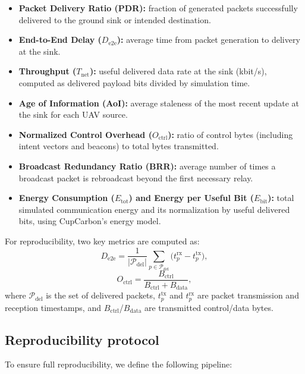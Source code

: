 \documentclass[5p,times]{elsarticle}
\begin{document}
\begin{itemize}
\item \textbf{Packet Delivery Ratio (PDR):} fraction of generated packets successfully delivered to the ground sink or intended destination.
\item \textbf{End-to-End Delay ($D_{\mathrm{e2e}}$):} average time from packet generation to delivery at the sink.
\item \textbf{Throughput ($T_{\mathrm{net}}$):} useful delivered data rate at the sink (kbit/s), computed as delivered payload bits divided by simulation time.
\item \textbf{Age of Information (AoI):} average staleness of the most recent update at the sink for each UAV source.
\item \textbf{Normalized Control Overhead ($O_{\mathrm{ctrl}}$):} ratio of control bytes (including intent vectors and beacons) to total bytes transmitted.
\item \textbf{Broadcast Redundancy Ratio (BRR):} average number of times a broadcast packet is rebroadcast beyond the first necessary relay.
\item \textbf{Energy Consumption ($E_{\mathrm{tot}}$) and Energy per Useful Bit ($E_{\mathrm{bit}}$):} total simulated communication energy and its normalization by useful delivered bits, using CupCarbon's energy model.
\end{itemize}
For reproducibility, two key metrics are computed as:
\begin{equation}
\label{eq:delay_metric}
D_{\mathrm{e2e}} = \frac{1}{|\mathcal{P}_{\mathrm{del}}|}\sum_{p\in\mathcal{P}_{\mathrm{del}}}\big(t_p^{\mathrm{rx}}-t_p^{\mathrm{tx}}\big),
\end{equation}
\begin{equation}
\label{eq:overhead_metric}
O_{\mathrm{ctrl}} = \frac{B_{\mathrm{ctrl}}}{B_{\mathrm{ctrl}}+B_{\mathrm{data}}},
\end{equation}
where $\mathcal{P}_{\mathrm{del}}$ is the set of delivered packets, $t_p^{\mathrm{tx}}$ and $t_p^{\mathrm{rx}}$ are packet transmission and reception timestamps, and $B_{\mathrm{ctrl}}$/$B_{\mathrm{data}}$ are transmitted control/data bytes.

\subsection{Reproducibility protocol}

To ensure full reproducibility, we define the following pipeline:
\end{document}
